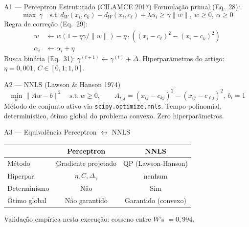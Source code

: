 \documentclass[aspectratio=169,10pt]{beamer}
\begin{document}

\begin{frame}{A1 --- Perceptron Estruturado (CILAMCE 2017)}
  \scriptsize
  Formula\c{c}\~ao primal (Eq.\ 28):
  \[ \max\ \gamma \quad \text{s.t.}\ d_W(x_i,c_k) - d_W(x_i,c_\ell) + \lambda\alpha_i \geq \gamma\|w\|,\ w \geq 0,\ \alpha \geq 0 \]
  Regra de corre\c{c}\~ao (Eq.\ 29):
  \begin{align*}
    w &\leftarrow w(1 - \eta\gamma/\|w\|) - \eta \cdot ((x_i-c_\ell)^2 - (x_i-c_k)^2) \\
    \alpha_i &\leftarrow \alpha_i + \eta
  \end{align*}
  Busca bin\'aria (Eq.\ 31): $\gamma^{(t+1)} \leftarrow \gamma^{(t)} + \Delta$. Hiperpar\^ametros do artigo: $\eta=0{,}001$, $C \in [0{,}1; 1{,}0]$.
\end{frame}

\begin{frame}{A2 --- NNLS (Lawson \& Hanson 1974)}
  \scriptsize
  \[ \min_w \|Aw - b\|^2 \quad \text{s.t.}\ w \geq 0, \qquad A_{i,j} = (x_{ij} - c_{kj})^2 - (x_{ij} - c_{\ell j})^2,\ b_i = 1 \]
  M\'etodo de conjunto ativo via \texttt{scipy.optimize.nnls}. Tempo polinomial, determin\'istico, \'otimo global do problema convexo. Zero hiperpar\^ametros.
\end{frame}

\begin{frame}{A3 --- Equival\^encia Perceptron $\leftrightarrow$ NNLS}
  \scriptsize
  \begin{center}
  \begin{tabular}{lcc}
    \toprule
    & Perceptron & NNLS \\
    \midrule
    M\'etodo  & Gradiente projetado & QP (Lawson-Hanson) \\
    Hiperpar.\ & $\eta, C, \Delta_\gamma$ & nenhum \\
    Determinismo & N\~ao & Sim \\
    \'Otimo global & N\~ao garantido & Garantido (convexo) \\
    \bottomrule
  \end{tabular}
  \end{center}
  Valida\c{c}\~ao emp\'irica nesta execu\c{c}\~ao: cosseno entre $W$'s $= 0{,}994$.
\end{frame}
\end{document}
